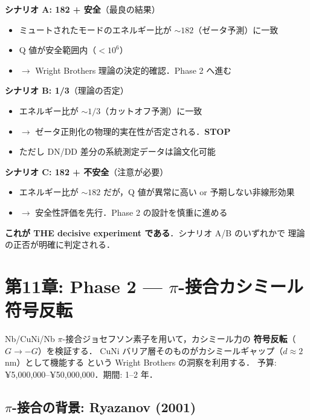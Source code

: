 \documentclass[11pt,a4paper]{article}
\begin{document}
\begin{gostopbox}
\textbf{シナリオ A: 182 + 安全}（最良の結果）
\begin{itemize}
\item ミュートされたモードのエネルギー比が $\sim 182$（ゼータ予測）に一致
\item Q 値が安全範囲内（$< 10^6$）
\item $\to$ Wright Brothers 理論の決定的確認．Phase 2 へ進む
\end{itemize}

\textbf{シナリオ B: 1/3}（理論の否定）
\begin{itemize}
\item エネルギー比が $\sim 1/3$（カットオフ予測）に一致
\item $\to$ ゼータ正則化の物理的実在性が否定される．\textbf{STOP}
\item ただし DN/DD 差分の系統測定データは論文化可能
\end{itemize}

\textbf{シナリオ C: 182 + 不安全}（注意が必要）
\begin{itemize}
\item エネルギー比が $\sim 182$ だが，Q 値が異常に高い or
  予期しない非線形効果
\item $\to$ 安全性評価を先行．Phase 2 の設計を慎重に進める
\end{itemize}

\textbf{これが THE decisive experiment である}．シナリオ A/B のいずれかで
理論の正否が明確に判定される．
\end{gostopbox}

\newpage
\section{第11章: Phase 2 — $\pi$-接合カシミール符号反転}

\begin{experimentbox}
Nb/CuNi/Nb $\pi$-接合ジョセフソン素子を用いて，カシミール力の
\textbf{符号反転}（$G \to -G$）を検証する．
CuNi バリア層そのものがカシミールギャップ（$d \approx 2$\,nm）として機能する
という Wright Brothers の洞察を利用する．
予算: ¥5,000,000--¥50,000,000．期間: 1--2 年．
\end{experimentbox}

\subsection{$\pi$-接合の背景: Ryazanov (2001)}
\end{document}
